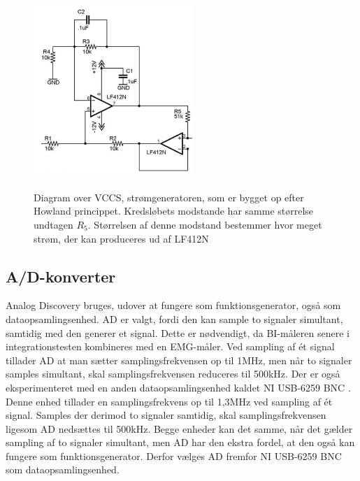 \begin{figure}[H]
\centering
{\includegraphics[width=6cm]
{Figure/howland1}}
\caption{Diagram over VCCS, strømgeneratoren, som er bygget op efter Howland princippet. Kredsløbets modstande har samme størrelse undtagen ${R_{5}}$. Størrelsen af denne modstand bestemmer hvor meget strøm, der kan produceres ud af LF412N  }
\label{fig:howland1}
\end{figure}







\subsection{A/D-konverter}

Analog Discovery bruges, udover at fungere som funktionsgenerator, også som dataopsamlingsenhed. AD er valgt, fordi den kan sample to signaler simultant, samtidig med den generer et signal. Dette er nødvendigt, da BI-måleren senere i integrationstesten kombineres med en EMG-måler.  Ved sampling af ét signal tillader AD at man sætter samplingsfrekvensen op til 1MHz, men når to signaler samples simultant, skal samplingsfrekvensen reduceres til 500kHz. 
Der er også eksperimenteret med en anden dataopsamlingsenhed kaldet NI USB-6259 BNC \cite{NI}. Denne enhed tillader en  samplingsfrekvens op til 1,3MHz ved sampling af ét signal. Samples der derimod to signaler samtidig, skal samplingsfrekvensen ligesom AD nedsættes  til 500kHz. Begge enheder kan det samme, når det gælder sampling af to signaler simultant, men AD har den ekstra fordel, at den også kan fungere som funktionsgenerator. Derfor vælges AD fremfor NI USB-6259 BNC som dataopsamlingsenhed.     


